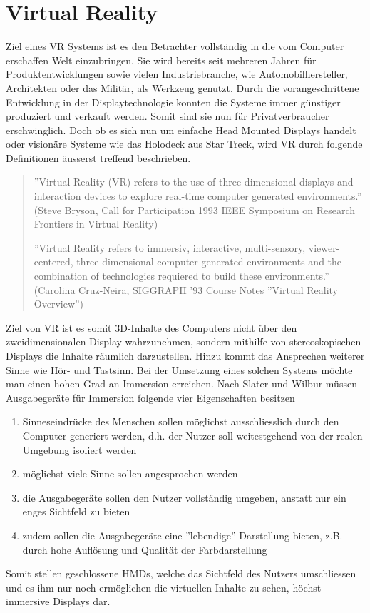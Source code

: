 \section{Virtual Reality}
Ziel eines VR Systems ist es den Betrachter vollständig in die vom Computer erschaffen Welt einzubringen. Sie wird bereits seit mehreren Jahren für Produktentwicklungen sowie vielen Industriebranche, wie Automobilhersteller, Architekten oder das Militär, als Werkzeug genutzt. Durch die vorangeschrittene Entwicklung in der Displaytechnologie konnten die Systeme immer günstiger produziert und verkauft werden. Somit sind sie nun für Privatverbraucher erschwinglich. Doch ob es sich nun um einfache Head Mounted Displays handelt oder visionäre Systeme wie das Holodeck aus Star Treck, wird VR durch folgende Definitionen äusserst treffend beschrieben.
\begin{quote}
''Virtual Reality (VR) refers to the use of three-dimensional displays and interaction devices to explore real-time computer generated environments.''\\
(Steve Bryson, Call for Participation 1993 IEEE Symposium on Research Frontiers in Virtual Reality)

''Virtual Reality refers to immersiv, interactive, multi-sensory, viewer-centered, three-dimensional computer generated environments and the combination of technologies requiered to build these environments.''\\
(Carolina Cruz-Neira, SIGGRAPH '93 Course Notes ''Virtual Reality Overview'')
\end{quote}
Ziel von VR ist es somit 3D-Inhalte des Computers nicht über den zweidimensionalen Display wahrzunehmen, sondern mithilfe von stereoskopischen Displays die Inhalte räumlich darzustellen. Hinzu kommt das Ansprechen weiterer Sinne wie Hör- und Tastsinn. Bei der Umsetzung eines solchen Systems möchte man einen hohen Grad an Immersion erreichen. Nach Slater und Wilbur \cite[S.~5~ff.]{slaterwilbur97} müssen Ausgabegeräte für Immersion folgende vier Eigenschaften besitzen
\begin{enumerate}\itemsep1pt \parskip0pt 
	\item Sinneseindrücke des Menschen sollen möglichst ausschliesslich durch den Computer generiert werden, d.h. der Nutzer soll weitestgehend von der realen Umgebung isoliert werden
	\item möglichst viele Sinne sollen angesprochen werden
	\item die Ausgabegeräte sollen den Nutzer vollständig umgeben, anstatt nur ein enges Sichtfeld zu bieten
	\item zudem sollen die Ausgabegeräte eine ''lebendige'' Darstellung bieten, z.B. durch hohe Auflösung und Qualität der Farbdarstellung
\end{enumerate}
Somit stellen geschlossene HMDs, welche das Sichtfeld des Nutzers umschliessen und es ihm nur noch ermöglichen die virtuellen Inhalte zu sehen, höchst immersive Displays dar.\cite[S.~12~ff.]{doerner13}\\[6pt]
\vspace{-30pt}
